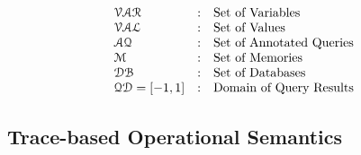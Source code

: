 \documentclass[a4paper,11pt]{article}
\begin{document}
%
\[
\begin{array}{lll}
\mathcal{VAR} & : & \mbox{Set of Variables}  
\\ 
%
\mathcal{VAL} & : & \mbox{Set of Values} 
\\ 
%
 \mathcal{AQ}  & : & \mbox{Set of Annotated Queries}  
\\
%
\memdom  & : & \mbox{{Set of Memories}} 
\\
%
\dbdom  & : & \mbox{{Set of Databases}} 
\\
%
\qdom = {[-1,1]} & : & \mbox{{Domain of Query Results}}
\end{array}
\]
%
%
\subsection{ Trace-based Operational Semantics}
\end{document}
